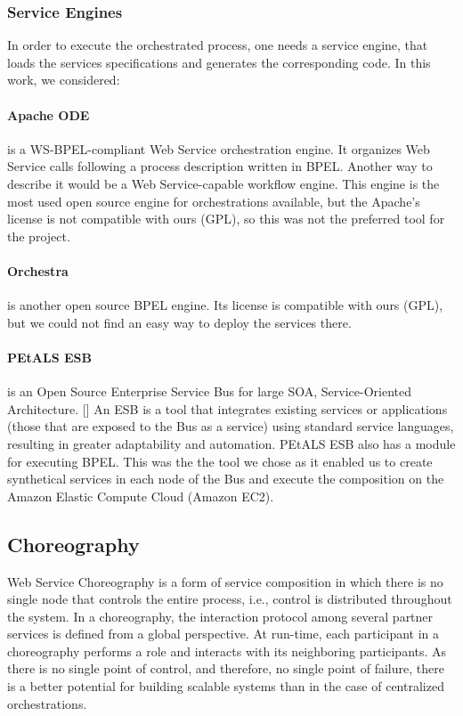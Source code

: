 \subsubsection{Service Engines}
In order to execute the orchestrated process, one needs a service engine, that loads the services specifications and generates the corresponding code. In this work, we considered:

\paragraph{Apache ODE}
is a WS-BPEL-compliant Web Service orchestration engine. It organizes Web Service calls following a process description written in BPEL. Another way to describe it would be a Web Service-capable workflow engine. This engine is the most used open source engine for orchestrations available, but the Apache's license is not compatible with ours (GPL), so this was not the preferred tool for the project.

\paragraph{Orchestra}
is another open source BPEL engine. Its license is compatible with ours (GPL), but we could not find an easy way to deploy the services there.

\paragraph{PEtALS ESB}
is an Open Source Enterprise Service Bus for large SOA, Service-Oriented Architecture. [\citet{PEtALS}] An ESB is a tool that integrates existing services or applications (those that are exposed to the Bus as a service) using standard service languages, resulting in greater adaptability and automation. PEtALS ESB also has a module for executing BPEL. This was the the tool we chose as it enabled us to create synthetical services in each node of the Bus and execute the composition on the Amazon Elastic Compute Cloud (Amazon EC2).


\subsection{Choreography}
Web Service Choreography is a form of service composition in which there is no single node that controls the entire process, i.e., control is distributed throughout the system. In a choreography, the interaction protocol among several partner services is defined from a global perspective. At run-time, each participant in a choreography performs a role and interacts with its neighboring participants. As there is no single point of control, and therefore, no single point of failure, there is a better potential for building scalable systems than in the case of centralized orchestrations.

